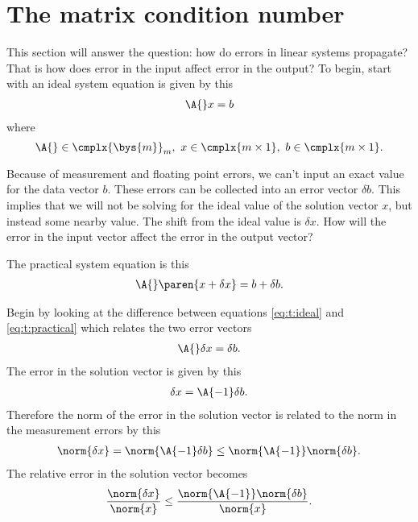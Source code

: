 \section{The matrix condition number}
This section will answer the question: how do errors in linear systems propagate? That is how does error in the input affect error in the output? To begin, start with an ideal system equation is given by this
\begin{equation}
  \begin{split}
    \A{} x = b
    \label{eq:t:ideal}
  \end{split}
\end{equation}
where
$$
\A{}\in\cmplx{\bys{m}}_{m},\ x\in\cmplx{m\times1},\ b\in\cmplx{m\times1}.
$$

Because of measurement and floating point errors, we can't input an exact value for the data vector $b$. These errors can be collected into an error vector $\delta b$. This implies that we will not be solving for the ideal value of the solution vector $x$, but instead some nearby value. The shift from the ideal value is $\delta x$. How will the error in the input vector affect the error in the output vector?

The practical system equation is this
\begin{equation}
  \begin{split}
    \A{}\paren{x+\delta x} = b+\delta b.
    \label{eq:t:practical}
  \end{split}
\end{equation}

Begin by looking at the difference between equations \eqref{eq:t:ideal} and \eqref{eq:t:practical} which relates the two error vectors
\begin{equation}
  \begin{split}
    \A{} \delta x = \delta b.
  \end{split}
\end{equation}
The error in the solution vector is given by this
\begin{equation}
  \begin{split}
    \delta x = \A{-1}\delta b.
  \end{split}
\end{equation}
Therefore the norm of the error in the solution vector is related to the norm in the measurement errors by this
\begin{equation}
  \begin{split}
    \norm{\delta x} = \norm{\A{-1}\delta b}\le \norm{\A{-1}} \norm{\delta b}.
  \end{split}
\end{equation}
The relative error in the solution vector becomes
\begin{equation}
  \begin{split}
    \frac{ \norm{\delta x}}{\norm{x}} \le \frac{ \norm{\A{-1}} \norm{\delta b}}{\norm{x}}.
  \end{split}
  \label{eq:t:errx}
\end{equation}

